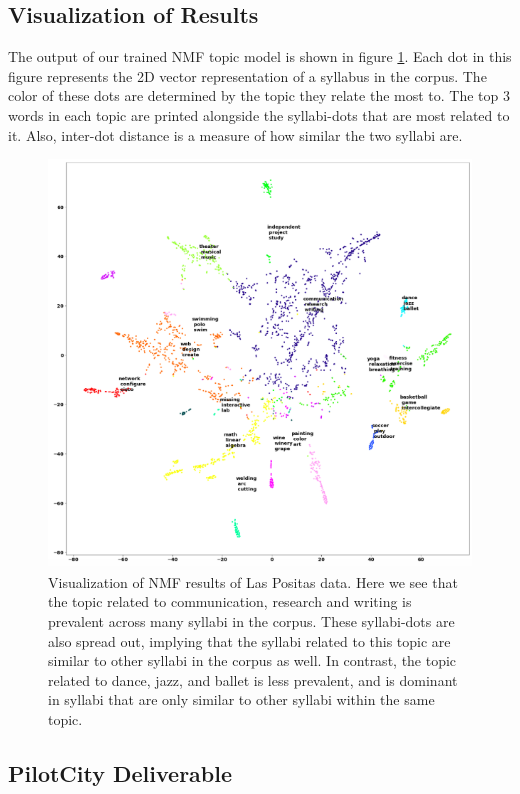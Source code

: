 \subsection{Visualization of Results}
The output of our trained NMF topic model is shown in figure \ref{fig:nmf-viz}. Each dot in this figure represents the 2D vector representation of a syllabus in the corpus. The color of these dots are determined by the topic they relate the most to. The top 3 words in each topic are printed alongside the syllabi-dots that are most related to it. Also, inter-dot distance is a measure of how similar the two syllabi are. 
\begin{figure}[H]
    \centering
    \includegraphics[scale=0.5]{nmf-visualization.png}
    \caption{Visualization of NMF results of Las Positas data. Here we see that the topic related to communication, research and writing is prevalent across many syllabi in the corpus. These syllabi-dots are also spread out, implying that the syllabi related to this topic are similar to other syllabi in the corpus as well. In contrast, the topic related to dance, jazz, and ballet is less prevalent, and is dominant in syllabi that are only similar to other syllabi within the same topic.}
    \label{fig:nmf-viz}
\end{figure}


\subsection{PilotCity Deliverable}

